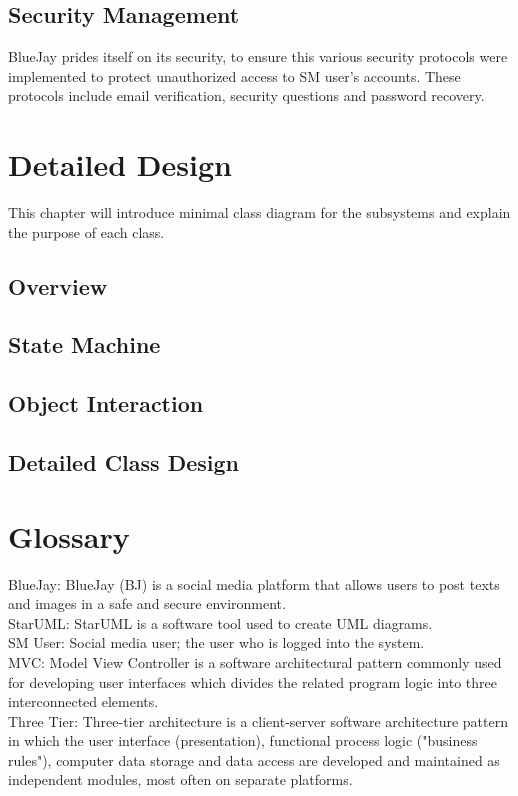 \documentclass{report}
\begin{document}
\section{Security Management}
	BlueJay prides itself on its security, to ensure this various security protocols were implemented to protect unauthorized access to SM user’s accounts. These protocols include email verification, security questions and password recovery. 
\chapter{Detailed Design}
	This chapter will introduce minimal class diagram for the subsystems and explain the purpose of each class.
\section{Overview}
\section{State Machine}
\section{Object Interaction}
\section{Detailed Class Design}
\chapter{Glossary}
BlueJay: BlueJay (BJ) is a social media platform that allows users to post texts and images in a safe and secure environment.\\
StarUML: StarUML is a software tool used to create UML diagrams.\\
SM User: Social media user; the user who is logged into the system.\\
MVC: Model View Controller is a software architectural pattern commonly used for developing user interfaces which divides the related program logic into three interconnected elements.\\
Three Tier: Three-tier architecture is a client-server software architecture pattern in which the user interface (presentation), functional process logic ("business rules"), computer data storage and data access are developed and maintained as independent modules, most often on separate platforms.\\
\end{document}
